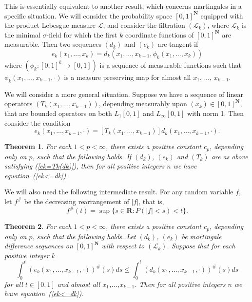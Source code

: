 \documentclass[12pt]{amsart}
\newtheorem{thm}{Theorem}
\begin{document}
This is essentially equivalent to another result, which concerns martingales
in a specific situation.  We will consider the probability space 
$[0,1]^\mathbf{N}$ equipped with the product Lebesgue measure $\mathcal L$,
and consider the filtration $(\mathcal{L}_k)$, where $\mathcal L_k$
is the minimal $\sigma$-field
for which the first $k$ coordinate functions of $[0,1]^{\mathbf{N}}$ are
measurable.  Then two sequences $(d_k)$ and $(e_k)$ are tangent
if 
\[ e_k (x_1,...,x_k)=d_k(x_1,...,x_{k-1},\phi_k(x_1,...,x_k))\]
where $(\phi_k:[0,1]^k\rightarrow [0,1])$ is a sequence of
measurable functions such that $\phi_k(x_1,...,x_{k-1},\cdot)$ is
a measure preserving map for almost all $x_1$, ..., $x_{k-1}$. 

We will consider a more general situation.  Suppose we have a
sequence of linear operators $(T_k(x_1,...,x_{k-1}))$, 
depending measurably upon $(x_k) \in [0,1]^{\mathbf{N}}$,
that are bounded operators on both 
$L_1[0,1]$ and $L_\infty [0,1]$ with norm 1.  Then consider the
condition
\begin{equation}
\label{ek=Tk(dk)}
e_k(x_1,...,x_{k-1}, \cdot
)=[T_k(x_1,...,x_{k-1})]d_k(x_1,...,x_{k-1}, \cdot ).
\end{equation}

\begin{thm}
\label{t ek<=dk T}
For each $1<p<\infty$, there exists a positive constant $c_p$, 
depending only on $p$, such
that the following holds.
If $(d_k)$, $(e_k)$ and $(T_k)$ are as above satisfying (\ref{ek=Tk(dk)}),
then for all positive integers $n$ we have
equation~(\ref{ek<=dk}).
\end{thm}

We will also need the following intermediate result.
For any random variable $f$, 
let $f^{\#}$ be the decreasing rearrangement of $|f|$, that is,
\[f^{\#}(t)=\sup\{ s\in \mathbf{R}: P(|f|<s)<t\}.\]

\begin{thm}
\label{t ek<=dk sharp}
For each $1<p<\infty$, there exists a positive constant $c_p$, 
depending only on $p$, such
that the following holds.
Let $(d_k)$, $(e_k)$ be martingale difference sequences on
$[0,1]^\mathbf{N}$ with respect to $(\mathcal{L}_k)$. 
Suppose that for each positive integer $k$
\[\int_0^t (e_k(x_1,...,x_{k-1},\cdot))^{\#}(s)ds 
\leq \int_0^t  (d_k(x_1,...,x_{k-1},\cdot))^{\#}(s)ds\]
for all $t\in [0,1]$ and almost all $x_1$,...,$x_{k-1}$.
Then for all positive integers $n$ we have
equation~(\ref{ek<=dk}).
\end{thm}
\end{document}
